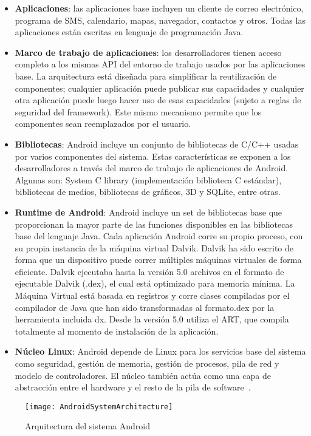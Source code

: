 \begin{itemize}
	\item\textbf{Aplicaciones}: las aplicaciones base incluyen un cliente de correo electrónico, programa de SMS, calendario, mapas, navegador, contactos y otros. Todas las aplicaciones están escritas en lenguaje de programación Java.
	\item\textbf{Marco de trabajo de aplicaciones}: los desarrolladores tienen acceso completo a los mismas API del entorno de trabajo usados por las aplicaciones base. La arquitectura está diseñada para simplificar la reutilización de componentes; cualquier aplicación puede publicar sus capacidades y cualquier otra aplicación puede luego hacer uso de esas capacidades (sujeto a reglas de seguridad del framework). Este mismo mecanismo permite que los componentes sean reemplazados por el usuario.
	\item\textbf{Bibliotecas}: Android incluye un conjunto de bibliotecas de C/C++ usadas por varios componentes del sistema. Estas características se exponen a los desarrolladores a través del marco de trabajo de aplicaciones de Android. Algunas son: System C library (implementación biblioteca C estándar), bibliotecas de medios, bibliotecas de gráficos, 3D y SQLite, entre otras.
	\item\textbf{Runtime de Android}: Android incluye un set de bibliotecas base que proporcionan la mayor parte de las funciones disponibles en las bibliotecas base del lenguaje Java. Cada aplicación Android corre su propio proceso, con su propia instancia de la máquina virtual Dalvik. Dalvik ha sido escrito de forma que un dispositivo puede correr múltiples máquinas virtuales de forma eficiente. Dalvik ejecutaba hasta la versión 5.0 archivos en el formato de ejecutable Dalvik (.dex), el cual está optimizado para memoria mínima. La Máquina Virtual está basada en registros y corre clases compiladas por el compilador de Java que han sido transformadas al formato.dex por la herramienta incluida dx. Desde la versión 5.0 utiliza el ART, que compila totalmente al momento de instalación de la aplicación.
	\item\textbf{Núcleo Linux}: Android depende de Linux para los servicios base del sistema como seguridad, gestión de memoria, gestión de procesos, pila de red y modelo de controladores. El núcleo también actúa como una capa de abstracción entre el hardware y el resto de la pila de software~\cite{wiki:android}.
\end{itemize}

\begin{figure}
\centering
\texttt{[image: AndroidSystemArchitecture]}
\caption{Arquitectura del sistema Android}
\label{fig:AndroidSystemArchitecture}
\end{figure}

